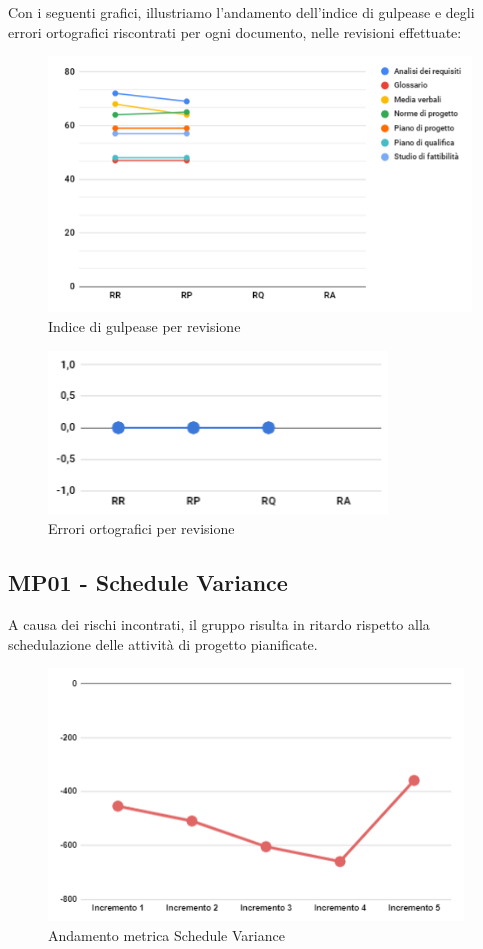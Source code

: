 \noindent Con i seguenti grafici, illustriamo l'andamento dell'indice di gulpease e degli errori ortografici riscontrati per ogni documento, nelle revisioni effettuate:
\begin{figure}[H]
	\centering
	\includegraphics[width=12cm]{images/gulpease.png}
	\caption{Indice di gulpease per revisione}
\end{figure}
\begin{figure}[H]
	\centering
	\includegraphics[width=9cm]{images/err_ortografici.png}
	\caption{Errori ortografici per revisione}
\end{figure}

\subsection{MP01 - Schedule Variance}
A causa dei rischi incontrati, il gruppo risulta in ritardo rispetto alla schedulazione delle attività di progetto pianificate.
\begin{figure}[H]
	\centering
	\includegraphics[width=11cm]{images/schedule_variance.png}
	\caption{Andamento metrica Schedule Variance}
\end{figure}

